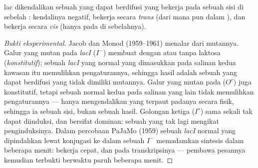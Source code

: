 \begin{proposition}\label{prop:b1:expression-control:jacobmonod}
 lac dikendalikan sebuah  yang dapat berdifusi yang bekerja
pada sebuah sisi di sebelah : kendalinya negatif, 
bekerja secara \emph{trans} (dari mana pun dalam ), dan
 bekerja secara \emph{cis} (hanya pada  di sebelahnya).
\end{proposition}
\begin{proof}[Bukti eksperimental]
Jacob dan Monod (1959--1961) menalar dari mutannya. Galur yang mutan
pada \emph{lacI} ($I^-$) membuat  dengan atau tanpa laktosa
(\emph{konstitutif}); sebuah  \emph{lacI} yang normal yang
dimasukkan pada salinan kedua kawasan itu memulihkan pengaturannya,
sehingga hasil  adalah sebuah  yang dapat berdifusi yang
tidak dimiliki mutannya. Galur yang mutan pada  ($O^c$) juga
konstitutif, tetapi sebuah  normal kedua pada salinan yang lain
tidak memulihkan pengaturannya ---  hanya mengendalikan 
yang terpaut padanya secara fisik, sehingga ia sebuah sisi, bukan
sebuah hasil. Golongan ketiga ($I^s$) sama sekali tak dapat diinduksi,
dan bersifat dominan: sebuah  yang tak lagi mengikat
penginduksinya. Dalam percobaan PaJaMo (1959) sebuah  \emph{lacI}
normal yang dipindahkan lewat konjugasi ke dalam sebuah  $I^-$
memadamkan sintesis  dalam beberapa menit:  bekerja
cepat, dan pada transkripsinya --- pembawa pesannya kemudian terbukti
berwaktu paruh beberapa menit.
\end{proof}

